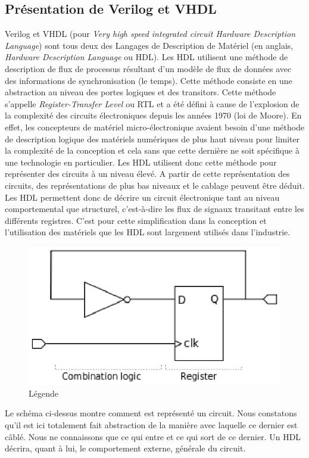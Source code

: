\subsection{Présentation de Verilog et VHDL}
Verilog et VHDL (pour \textit{Very high speed integrated circuit Hardware Description Language}) sont tous deux des Langages de Description de Matériel (en anglais, \textit{Hardware Description Language} ou HDL). Les HDL utilisent une méthode de description de flux de processus résultant d'un modèle de flux de données avec des informations de synchronisation (le temps). Cette méthode consiste en une abstraction au niveau des portes logiques et des transitors.  Cette méthode s'appelle \textit{Register-Transfer Level} ou RTL et a été défini à cause de l'explosion de la complexité des circuits électroniques depuis les années 1970 (loi de Moore). En effet, les concepteurs de matériel micro-électronique avaient besoin d'une méthode de description logique des matériels numériques de plus haut niveau pour limiter la complexité de la conception et cela sans que cette dernière ne soit spécifique à une technologie en particulier. Les HDL utilisent donc cette méthode pour représenter des circuits à un niveau élevé. A partir de cette représentation des circuits, des représentations de plus bas niveaux et le cablage peuvent être déduit. Les HDL permettent donc de décrire un circuit électronique tant au niveau comportemental que structurel, c'est-à-dire les flux de signaux transitant entre les différents registres.  C'est pour cette simplification dans la conception et l'utilisation des matériels que les HDL sont largement utilisés dans l'industrie.  \newpage

\begin{figure}
\begin{center}
\includegraphics[scale=0.8]{rtl_example.eps}
\end{center}
\caption{Légende}
\label{Référence}
\end{figure}
Le schéma ci-dessus montre comment est représenté un circuit. Nous constatons qu'il est ici totalement fait abstraction de la manière avec laquelle ce dernier est câblé. Nous ne connaissons que ce qui entre et ce qui sort de ce dernier. Un HDL décrira, quant à lui, le {\og}comportement{\fg} externe, générale du circuit.

